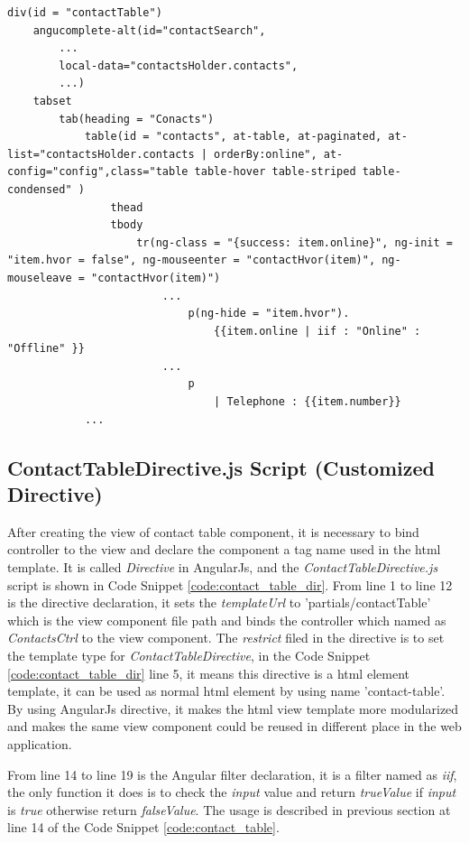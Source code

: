 \begin{lstlisting}[caption={contactTable.jade in application client},label={code:contact_table}]
div(id = "contactTable")
	angucomplete-alt(id="contactSearch",
		...
		local-data="contactsHolder.contacts",
		...)
	tabset
		tab(heading = "Conacts")
			table(id = "contacts", at-table, at-paginated, at-list="contactsHolder.contacts | orderBy:online", at-config="config",class="table table-hover table-striped table-condensed" )
				thead
				tbody
					tr(ng-class = "{success: item.online}", ng-init = "item.hvor = false", ng-mouseenter = "contactHvor(item)", ng-mouseleave = "contactHvor(item)")
						...
							p(ng-hide = "item.hvor").
								{{item.online | iif : "Online" : "Offline" }}
                        ...
							p
								| Telephone : {{item.number}}
			...
\end{lstlisting}

\subsection{ContactTableDirective.js Script (Customized Directive)}

\par After creating the view of contact table component, it is necessary to bind controller to the view and declare the component a tag name used in the \gls{html} template. It is called \textit{Directive} in AngularJs, and the \textit{ContactTableDirective.js} script is shown in Code Snippet \ref{code:contact_table_dir}. From line 1 to line 12 is the directive declaration, it sets the \textit{templateUrl} to 'partials/contactTable' which is the view component file path and binds the controller which named as \textit{ContactsCtrl} to the view component. The \textit{restrict} filed in the directive is to set the template type for \textit{ContactTableDirective}, in the Code Snippet \ref{code:contact_table_dir} line 5, it means this directive is a \gls{html} element template, it can be used as normal \gls{html} element by using name 'contact-table'. By using AngularJs directive, it makes the \gls{html} view template more modularized and makes the same view component could be reused in different place in the web application.

\par From line 14 to line 19 is the Angular filter declaration, it is a filter named as  \textit{iif}, the only function it does is to check the \textit{input} value and return \textit{trueValue} if \textit{input} is \textit{true} otherwise return \textit{falseValue}. The usage is described in previous section at line 14 of the Code Snippet \ref{code:contact_table}.


